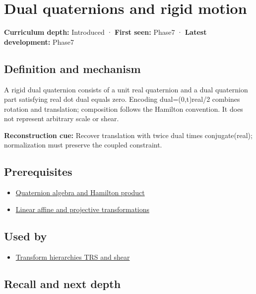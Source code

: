 \hypertarget{appendix-d1ea57347893}{}
\section{Dual quaternions and rigid motion}\label{appendix-d1ea57347893-dual-quaternions-and-rigid-motion}

\textbf{Curriculum depth:} Introduced · \textbf{First seen:} Phase7 · \textbf{Latest development:} Phase7

\subsection{Definition and mechanism}\label{appendix-d1ea57347893-definition-and-mechanism}

A rigid dual quaternion consists of a unit real quaternion and a dual quaternion part satisfying real dot dual equals zero. Encoding dual=(0,t)real/2 combines rotation and translation; composition follows the Hamilton convention. It does not represent arbitrary scale or shear.

\textbf{Reconstruction cue:} Recover translation with twice dual times conjugate(real); normalization must preserve the coupled constraint.

\subsection{Prerequisites}\label{appendix-d1ea57347893-prerequisites}

\begin{itemize}
\tightlist
\item
  \hyperref[appendix-965d9260eeab]{Quaternion algebra and Hamilton product}
\item
  \hyperref[appendix-0bf0ca73f735]{Linear affine and projective transformations}
\end{itemize}

\subsection{Used by}\label{appendix-d1ea57347893-used-by}

\begin{itemize}
\tightlist
\item
  \hyperref[appendix-292c061cd47c]{Transform hierarchies TRS and shear}
\end{itemize}

\subsection{Recall and next depth}\label{appendix-d1ea57347893-recall-and-next-depth}

